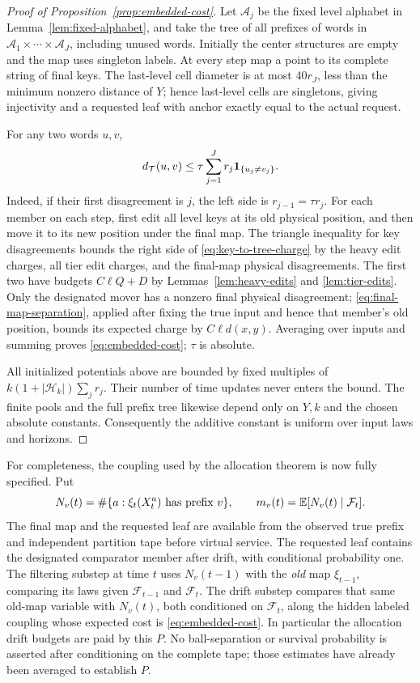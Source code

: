 \begin{proof}[Proof of Proposition~\ref{prop:embedded-cost}]
Let \(\mathcal A_j\) be the fixed level alphabet in
Lemma~\ref{lem:fixed-alphabet}, and take the tree of all prefixes of
words in \(\mathcal A_1\times\cdots\times\mathcal A_J\), including
unused words.  Initially the center structures are empty and the map
uses singleton labels.  At every step map a point to its complete
string of final keys.  The last-level cell diameter is at most
\(40r_J\), less than the minimum nonzero distance of \(Y\); hence
last-level cells are singletons, giving injectivity and a requested
leaf with anchor exactly equal to the actual request.

For any two words \(u,v\),
\begin{equation}\label{eq:key-to-tree-charge}
 d_{\mathcal T}(u,v)
 \le\tau\sum_{j=1}^Jr_j\mathbf 1_{\{u_j\ne v_j\}}.
\end{equation}
Indeed, if their first disagreement is \(j\), the left side is
\(r_{j-1}=\tau r_j\).  For each member on each step, first edit all
level keys at its old physical position, and then move it to its new
position under the final map.  The triangle inequality for key
disagreements bounds the right side of
\eqref{eq:key-to-tree-charge} by the heavy edit charges, all tier edit
charges, and the final-map physical disagreements.  The first two have
budgets \(C\ell Q+D\) by Lemmas~\ref{lem:heavy-edits} and
\ref{lem:tier-edits}.  Only the designated mover has a nonzero final
physical disagreement; \eqref{eq:final-map-separation}, applied after
fixing the true input and hence that member's old position, bounds its
expected charge by \(C\ell d(x,y)\).  Averaging over inputs and
summing proves \eqref{eq:embedded-cost}; \(\tau\) is absolute.

All initialized potentials above are bounded by fixed multiples of
\(k(1+|\mathcal H_k|)\sum_jr_j\).  Their number of time updates never
enters the bound.  The finite pools and the full prefix tree likewise
depend only on \(Y,k\) and the chosen absolute constants.  Consequently
the additive constant is uniform over input laws and horizons.
\end{proof}

For completeness, the coupling used by the allocation theorem is now
fully specified.  Put
\[
 N_v(t)=\#\{a:\xi_t(X_t^a)\text{ has prefix }v\},\qquad
 m_v(t)=\mathbb E[N_v(t)\mid\mathcal F_t].
\]
The final map and the requested leaf are available from the observed true
prefix and independent partition tape before virtual service.  The
requested leaf contains the designated comparator member after drift,
with conditional probability one.  The filtering substep at time \(t\)
uses \(N_v(t-1)\) with the \emph{old} map \(\xi_{t-1}\), comparing
its laws given \(\mathcal F_{t-1}\) and \(\mathcal F_t\).  The drift
substep compares that same old-map variable with \(N_v(t)\), both
conditioned on \(\mathcal F_t\), along the hidden labeled coupling
whose expected cost is \eqref{eq:embedded-cost}.  In particular the
allocation drift budgets are paid by this \(P\).  No ball-separation
or survival probability is asserted after conditioning on the complete
tape; those estimates have already been averaged to establish \(P\).

